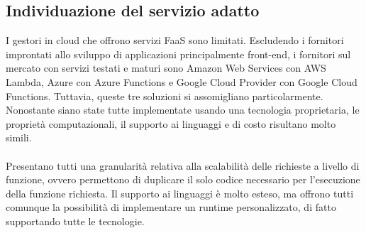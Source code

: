 \subsection{Individuazione del servizio adatto}

I gestori in cloud che offrono servizi FaaS sono limitati.
Escludendo i fornitori improntati allo sviluppo di applicazioni principalmente front-end,
i fornitori sul mercato con servizi testati e maturi sono
Amazon Web Services con AWS Lambda, Azure con Azure Functions e Google Cloud Provider con Google Cloud Functions.
Tuttavia, queste tre soluzioni si assomigliano particolarmente.
Nonostante siano state tutte implementate usando una tecnologia proprietaria,
le proprietà computazionali, il supporto ai linguaggi e di costo risultano molto simili.\\
\\
Presentano tutti una granularità relativa alla scalabilità delle richieste a livello di funzione,
ovvero permettono di duplicare il solo codice necessario per l'esecuzione della funzione richiesta.
Il supporto ai linguaggi è molto esteso,
ma offrono tutti comunque la possibilità di implementare un runtime personalizzato,
di fatto supportando tutte le tecnologie.\\

